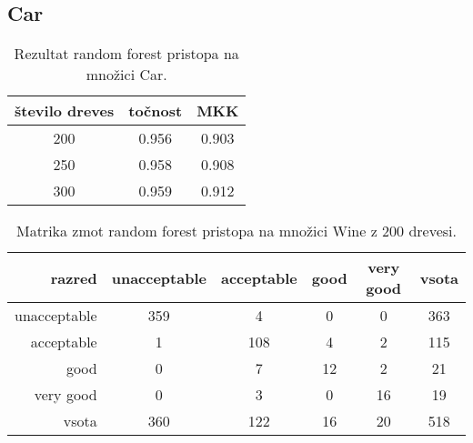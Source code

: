 \subsection{Car}\label{subsec:random-forest-car-test}
\begin{table}[H]
    \begin{center}
        \begin{tabular}{|| c | c c ||}
            \hline
            število dreves & točnost & MKK   \\
            \hline
            200            & 0.956   & 0.903 \\
            \hline
            250            & 0.958   & 0.908 \\
            \hline
            300            & 0.959   & 0.912 \\
            \hline
        \end{tabular}
    \end{center}
    \caption{Rezultat random forest pristopa na množici Car.}
    \label{tab:rforest_car_result}
\end{table}

\begin{table}[H]
    \centering
    \begin{tabular}{||rccccc||}
        \hline
        razred       & unacceptable & acceptable & good & very good & vsota \\ \hline
        unacceptable & 359          & 4          & 0    & 0         & 363   \\ \hline
        acceptable   & 1            & 108        & 4    & 2         & 115   \\ \hline
        good         & 0            & 7          & 12   & 2         & 21    \\ \hline
        very good    & 0            & 3          & 0    & 16        & 19    \\ \hline
        vsota        & 360          & 122        & 16   & 20        & 518   \\ \hline
    \end{tabular}
    \caption{Matrika zmot random forest pristopa na množici Wine z 200 drevesi.}
    \label{tab:rforest_car_cm_1}
\end{table}

